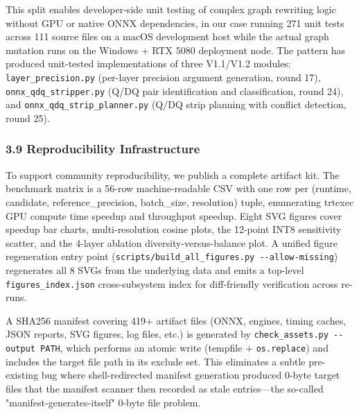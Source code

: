 \documentclass[
]{article}
\begin{document}
This split enables developer-side unit testing of complex graph
rewriting logic without GPU or native ONNX dependencies, in our case
running 271 unit tests across 111 source files on a macOS development
host while the actual graph mutation runs on the Windows + RTX 5080
deployment node. The pattern has produced unit-tested implementations of
three V1.1/V1.2 modules: \texttt{layer\_precision.py} (per-layer
precision argument generation, round 17),
\texttt{onnx\_qdq\_stripper.py} (Q/DQ pair identification and
classification, round 24), and \texttt{onnx\_qdq\_strip\_planner.py}
(Q/DQ strip planning with conflict detection, round 25).

\subsubsection{3.9 Reproducibility
Infrastructure}\label{39-reproducibility-infrastructure}

To support community reproducibility, we publish a complete artifact
kit. The benchmark matrix is a 56-row machine-readable CSV with one row
per (runtime, candidate, reference\_precision, batch\_size, resolution)
tuple, enumerating trtexec GPU compute time speedup and throughput
speedup. Eight SVG figures cover speedup bar charts, multi-resolution
cosine plots, the 12-point INT8 sensitivity scatter, and the 4-layer
ablation diversity-versus-balance plot. A unified figure regeneration
entry point (\texttt{scripts/build\_all\_figures.py\ -\/-allow-missing})
regenerates all 8 SVGs from the underlying data and emits a top-level
\texttt{figures\_index.json} cross-subsystem index for diff-friendly
verification across re-runs.

A SHA256 manifest covering 419+ artifact files (ONNX, engines, timing
caches, JSON reports, SVG figures, log files, etc.) is generated by
\texttt{check\_assets.py\ -\/-output\ PATH}, which performs an atomic
write (tempfile + \texttt{os.replace}) and includes the target file path
in its exclude set. This eliminates a subtle pre-existing bug where
shell-redirected manifest generation produced 0-byte target files that
the manifest scanner then recorded as stale entries---the so-called
"manifest-generates-itself" 0-byte file problem.
\end{document}
